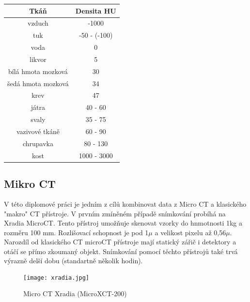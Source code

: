 \documentclass{thesis}%
\begin{document}
\begin{center}
\begin{tabular}{c|c}
 \centering
\bfseries \bfseries Tkáň & \bfseries Densita HU\\
\hline \hline
vzduch                      & -1000\\
tuk                            & -50 - (-100)\\
voda                         & 0\\
likvor                         & 5\\
bílá hmota mozková  & 30\\
šedá hmota mozková& 34\\
krev                           & 47\\
játra                          & 40 - 60\\
svaly                         & 35 - 75\\
vazivové tkáně         & 60 - 90\\
chrupavka                 & 80 - 130 \\
kost                           & 1000 - 3000 
\end{tabular}
\end{center}
\newpage
\subsection{Mikro CT}
V této diplomové práci je jedním z cílů kombinovat data z Micro CT a klasického "makro" CT přístroje. V prvním zmíněném případě snímkování probíhá na Xradia MicroCT. Tento přístroj umožňuje skenovat vzorky do hnmotnosti 1kg a rozměru 100 mm. Rozlišovací schopnost je pod 1$\mu$  a velikost pixelu až 0,56$\mu$. Narozdíl od klasického CT microCT přístroje mají statický zářič i detektory a otáčí se přímo zkoumaný objekt. Snímkování pomocí těchto přístrojů také trvá výrazně delší dobu (standartně několik hodin).
\begin{figure}[ht!]
 \centering
	\texttt{[image: xradia.jpg]}
	\caption[Micro CT Xradia]{Micro CT Xradia (MicroXCT-200) }
\end{figure}
\end{document}
